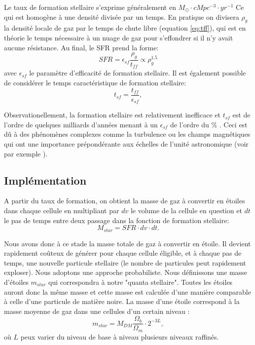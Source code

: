 Le taux de formation stellaire s'exprime généralement en $M_\odot \cdot cMpc^{-3} \cdot yr^{-1}$  
Ce qui est homogène à une densité divisée par un temps.
En pratique on divisera $\rho_g$ la densité locale de gaz par le temps de chute libre (equation \ref{eq:tff}), qui est en théorie le temps nécessaire à un nuage de gaz pour s'effondrer si il n'y avait aucune résistance.
Au final, le \ac{SFR} prend la forme:
\begin{equation}
	SFR = \epsilon_{sf} \frac{\rho_g}{t_{ff}} \propto \rho_g^{1.5}
    \label{eq_sfr}
\end{equation}
avec  $\epsilon_{sf}$ le paramètre d'efficacité de formation stellaire.
Il est également possible de considérer le temps caractéristique de formation stellaire:
\begin{equation}
t_{sf} =  \frac{t_{ff}}{\epsilon_{sf}},
\end{equation}


Observationellement, la formation stellaire est relativement inefficace et $t_{sf}$ est de l'ordre de quelques milliards d'années menant à un $\epsilon_{sf}$ de l'ordre du \% \citep{krumholz_universal_2012}.
Ceci est dû à des phénomènes complexes comme la turbulence ou les champs magnétiques qui ont une importance prépondérante aux échelles de l'unité astronomique (voir par exemple \cite{2015MNRAS.450.4035F}).


\subsection{Implémentation}

A partir du taux de formation, on obtient la masse de gaz à convertir en étoiles dans chaque cellule en multipliant par $dv$ le volume de la cellule en question et $dt$ le pas de temps entre deux passage dans la fonction de formation stellaire:
\begin{equation}
	M_{star} = SFR \cdot dv \cdot dt .
\end{equation}

Nous avons donc à ce stade la masse totale de gaz à convertir en étoile.
Il devient rapidement coûteux de générer pour chaque cellule éligible, et à chaque pas de temps, une nouvelle particule stellaire (le nombre de particules peut rapidement exploser).
Nous adoptons une approche probabiliste.
Nous définissons une masse d'étoiles $m_{star}$ qui correspondra à notre "quanta stellaire".
Toutes les étoiles auront donc la même masse et cette masse est calculée d'une manière comparable à celle d'une particule de matière noire.
La masse d'une étoile correspond à la masse moyenne de gaz dans une cellules d'un certain niveau :
\begin{equation}
 m_{star} = M_{DM} \frac{\Omega_b}{\Omega_m}\cdot 2^{-3L},
\end{equation}
où $L$ peux varier du niveau de base à niveau plusieurs niveaux raffinés.


